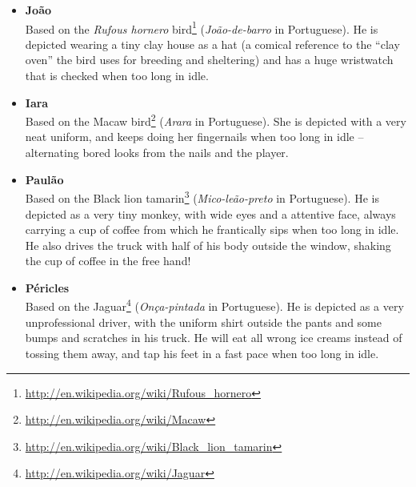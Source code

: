 \documentclass[a4paper]{scrartcl}
\begin{document}
            \begin{itemize}
                \item \textbf{Jo\~ao}\\
                      Based on the \textit{Rufous hornero}
                      bird\footnote{\url{http://en.wikipedia.org/wiki/Rufous_hornero}}
                      (\textit{Jo\~ao-de-barro} in Portuguese). He is depicted
                      wearing a tiny clay house as a hat (a comical reference to
                      the ``clay oven'' the bird uses for breeding and
                      sheltering) and has a huge wristwatch that is checked when
                      too long in idle.

                \item \textbf{Iara}\\
                      Based on the Macaw
                      bird\footnote{\url{http://en.wikipedia.org/wiki/Macaw}}
                      (\textit{Arara} in Portuguese). She is depicted with a
                      very neat uniform, and keeps doing her fingernails when
                      too long in idle -- alternating bored looks from the nails
                      and the player.

                \item \textbf{Paul\~ao}\\
                      Based on the Black lion tamarin\footnote{\url{http://en.wikipedia.org/wiki/Black_lion_tamarin}}
                      (\textit{Mico-le\~ao-preto} in Portuguese). He is depicted
                      as a very tiny monkey, with wide eyes and a attentive
                      face, always carrying a cup of coffee from which he
                      frantically sips when too long in idle. He also drives the
                      truck with half of his body outside the window, shaking
                      the cup of coffee in the free hand!

                \item \textbf{P\'ericles}\\
                      Based on the Jaguar\footnote{\url{http://en.wikipedia.org/wiki/Jaguar}}
                      (\textit{On\c{c}a-pintada} in Portuguese). He is depicted
                      as a very unprofessional driver, with the uniform shirt
                      outside the pants and some bumps and scratches in his
                      truck. He will eat all wrong ice creams instead of tossing
                      them away, and tap his feet in a fast pace when too long
                      in idle.
            \end{itemize}
\end{document}

